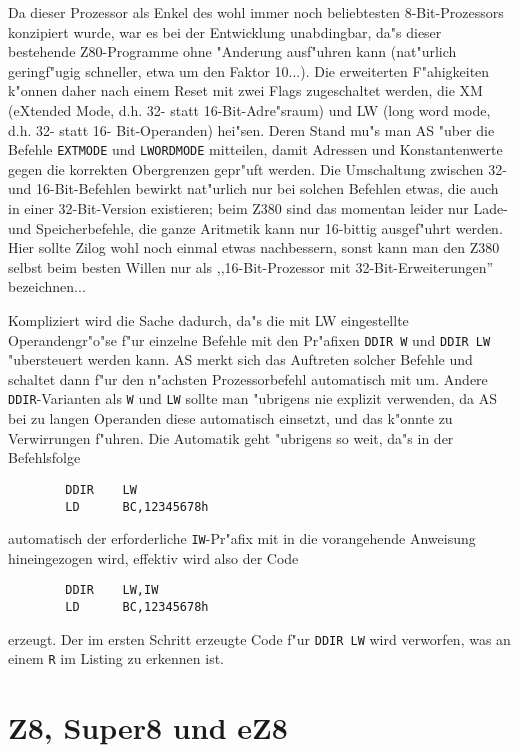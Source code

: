 \documentclass[12pt,a4paper,twoside]{report}
\newcommand{\tty}[1]{{\tt #1}}
\begin{document}
Da dieser Prozessor als Enkel des wohl immer noch beliebtesten
8-Bit-Prozessors konzipiert wurde, war es bei der Entwicklung
unabdingbar, da"s dieser bestehende Z80-Programme ohne "Anderung
ausf"uhren kann (nat"urlich geringf"ugig schneller, etwa um den
Faktor 10...).  Die erweiterten F"ahigkeiten k"onnen daher nach
einem Reset mit zwei Flags zugeschaltet werden, die XM (eXtended
Mode, d.h. 32- statt 16-Bit-Adre"sraum) und LW (long word mode,
d.h. 32- statt 16- Bit-Operanden) hei"sen.  Deren Stand mu"s man
AS "uber die Befehle \tty{EXTMODE} und \tty{LWORDMODE} mitteilen, damit
Adressen und Konstantenwerte gegen die korrekten Obergrenzen
gepr"uft werden.  Die Umschaltung zwischen 32- und 16-Bit-Befehlen
bewirkt nat"urlich nur bei solchen Befehlen etwas, die auch in
einer 32-Bit-Version existieren; beim Z380 sind das momentan
leider nur Lade- und Speicherbefehle, die ganze Aritmetik kann
nur 16-bittig ausgef"uhrt werden.  Hier sollte Zilog wohl noch
einmal etwas nachbessern, sonst kann man den Z380 selbst beim
besten Willen nur als ,,16-Bit-Prozessor mit 32-Bit-Erweiterungen''
bezeichnen...

Kompliziert wird die Sache dadurch, da"s die mit LW eingestellte
Operandengr"o"se f"ur einzelne Befehle mit den Pr"afixen \tty{DDIR W}
und \tty{DDIR LW} "ubersteuert werden kann.  AS merkt sich das
Auftreten solcher Befehle und schaltet dann f"ur den n"achsten
Prozessorbefehl automatisch mit um.  Andere \tty{DDIR}-Varianten
als \tty{W} und \tty{LW} sollte man "ubrigens nie explizit
verwenden, da AS bei zu langen Operanden diese automatisch
einsetzt, und das k"onnte zu Verwirrungen f"uhren.  Die Automatik
geht "ubrigens so weit, da"s in der Befehlsfolge
\begin{verbatim}
        DDIR    LW
        LD      BC,12345678h
\end{verbatim}
automatisch der erforderliche \tty{IW}-Pr"afix mit in die
vorangehende Anweisung hineingezogen wird, effektiv wird also
der Code
\begin{verbatim}
        DDIR    LW,IW
        LD      BC,12345678h
\end{verbatim}
erzeugt.  Der im ersten Schritt erzeugte Code f"ur \tty{DDIR LW}
wird verworfen, was an einem \tty{R} im Listing zu erkennen
ist.


\section{Z8, Super8 und eZ8}
\label{Z8Spec}
\end{document}
